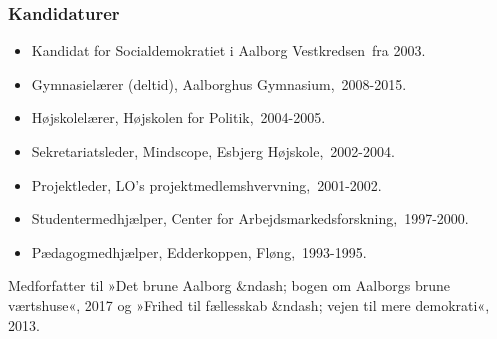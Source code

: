 \documentclass[11pt, a4paper]{awesome-cv}
\begin{document}
\begin{cvletter}
\subsubsection*{Kandidaturer}
\begin{itemize}
\item Kandidat for Socialdemokratiet i Aalborg Vestkredsen fra 2003.
\end{itemize}
\begin{itemize}
\item Gymnasielærer (deltid), Aalborghus Gymnasium, 2008-2015.
\item Højskolelærer, Højskolen for Politik, 2004-2005.
\item Sekretariatsleder, Mindscope, Esbjerg Højskole, 2002-2004.
\item Projektleder, LO's projektmedlemshvervning, 2001-2002.
\item Studentermedhjælper, Center for Arbejdsmarkedsforskning, 1997-2000.
\item Pædagogmedhjælper, Edderkoppen, Fløng, 1993-1995.
\end{itemize}
Medforfatter til »Det brune Aalborg &ndash;  bogen om Aalborgs brune værtshuse«, 2017 og »Frihed til fællesskab &ndash; vejen til mere demokrati«, 2013.

\end{cvletter}
\end{document}
